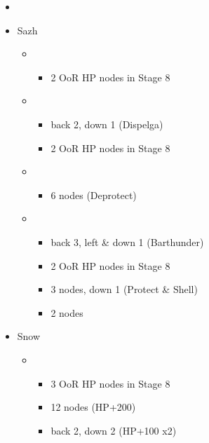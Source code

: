\begin{menu}
	\begin{itemize}
	\paradigm
		\begin{itemize}
			\item {}%
				{\paradigmline{\com}{\com}{\med}}%
				{\paradigmline[4]{\com}{\com}{\sab}}%
				{\paradigmline{\syn}{\sen}{(\sab)}}%
				{\paradigmline{(\rav)}{\rav}{(\rav)}}%
				{\paradigmline{\com}{\sen}{\sab}}%
				{\paradigmline{\rav}{(\sen)}{(\rav)}}%
		\end{itemize}
	\crystarium
		\begin{itemize}
			\item Sazh
				\begin{itemize}
					\item \com
						\begin{itemize}
							\item 2 OoR HP nodes in Stage 8
						\end{itemize}
					\item \rav
						\begin{itemize}
							\item back 2, down 1 (Dispelga)
							\item 2 OoR HP nodes in Stage 8
						\end{itemize}
					\item \sab
						\begin{itemize}
							\item 6 nodes (Deprotect)
						\end{itemize}
					\item \syn
						\begin{itemize}
							\item back 3, left \& down 1 (Barthunder)
							\item 2 OoR HP nodes in Stage 8
							\item 3 nodes, down 1 (Protect \& Shell)
							\item 2 nodes
						\end{itemize}
				\end{itemize}
			\item Snow
				\begin{itemize}
					\item \sen
						\begin{itemize}
							\item 3 OoR HP nodes in Stage 8
							\item 12 nodes (HP+200)
							\item back 2, down 2 (HP+100 x2)

\end{itemize}
\end{itemize}
\end{itemize}
\end{itemize}
\end{menu}
